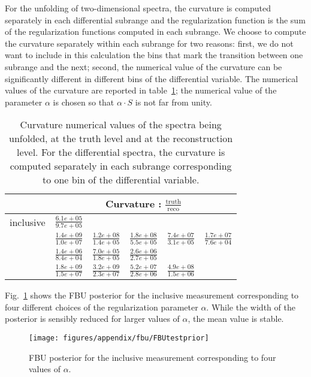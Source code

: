 For the unfolding of two-dimensional spectra, the curvature is
computed separately in each differential subrange and the
regularization function is the sum of the regularization functions
computed in each subrange.  We choose to compute the curvature
separately within each subrange for two reasons: first, we do not want
to include in this calculation the bins that mark the transition
between one subrange and the next; second, the numerical value of the
curvature can be significantly different in different bins of the
differential variable.  The numerical values of the curvature are
reported in table~\ref{tab:curvature}; the numerical value of the
parameter $\alpha{}$ is chosen so that $\alpha{}\cdot{}S$ is not far
from unity.
%
\begin{table}[htbp]
  \begin{center}
  \begin{tabular}{ l ccccc }
  \toprule
   & \multicolumn{5}{c}{Curvature : $\frac{\text{truth}}{\text{reco}}$} \\
   \midrule
   inclusive & $\frac{6.1e+05}{9.7e+05}$ & & & & \\
   \mtt{} & $\frac{1.4e+09}{1.0e+07}$ & $\frac{1.2e+08}{1.4e+05}$ & $\frac{1.8e+08}{5.5e+05}$ & $\frac{7.4e+07}{3.1e+05}$ & $\frac{1.7e+07}{7.6e+04}$ \\
   \pttt{} & $\frac{1.4e+06}{8.4e+04}$ & $\frac{7.0e+05}{1.8e+05}$ & $\frac{2.6e+06}{2.7e+05}$ & & \\
   \ytt{} & $\frac{1.8e+09}{1.5e+07}$ & $\frac{3.2e+09}{2.3e+07}$ & $\frac{5.2e+07}{2.8e+06}$ & $\frac{4.9e+08}{1.5e+06}$ & \\
   \bottomrule
    \end{tabular}
  \end{center}
  \caption{Curvature numerical values of the spectra being unfolded,
  at the truth level and at the reconstruction level. For the
  differential spectra, the curvature is computed separately in each
  subrange corresponding to one bin of the differential variable.
  }
  \label{tab:curvature}
\end{table}

Fig.~\ref{fig:app:fbutestprior} shows the FBU posterior for the inclusive measurement
corresponding to four different choices of the regularization parameter $\alpha{}$.
While the width of the posterior is sensibly reduced for larger values of $\alpha{}$, the mean value is stable.

\begin{figure}
  \begin{center}
  \texttt{[image: figures/appendix/fbu/FBUtestprior]}
  \caption{
    \label{fig:app:fbutestprior}
    FBU posterior for the inclusive measurement corresponding to four values of $\alpha{}$.
    }
  \end{center}
\end{figure}


